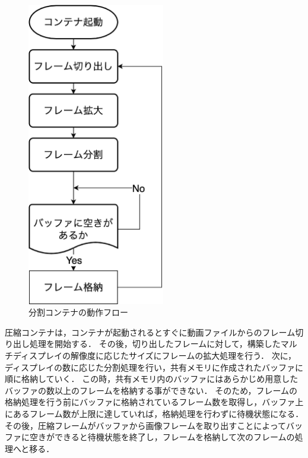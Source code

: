 \begin{figure}[H]
    \hspace*{\fill}
    \includegraphics[width=60mm]{./fig/chap3/bunkatu_flow.eps}
    \hspace*{\fill}
    \caption{分割コンテナの動作フロー}
\end{figure}

圧縮コンテナは，コンテナが起動されるとすぐに動画ファイルからのフレーム切り出し処理を開始する．
その後，切り出したフレームに対して，構築したマルチディスプレイの解像度に応じたサイズにフレームの拡大処理を行う．
次に，ディスプレイの数に応じた分割処理を行い，共有メモリに作成されたバッファに順に格納していく．
この時，共有メモリ内のバッファにはあらかじめ用意したバッファの数以上のフレームを格納する事ができない．
そのため，フレームの格納処理を行う前にバッファに格納されているフレーム数を取得し，バッファ上にあるフレーム数が上限に達していれば，格納処理を行わずに待機状態になる．
その後，圧縮フレームがバッファから画像フレームを取り出すことによってバッファに空きができると待機状態を終了し，フレームを格納して次のフレームの処理へと移る．


